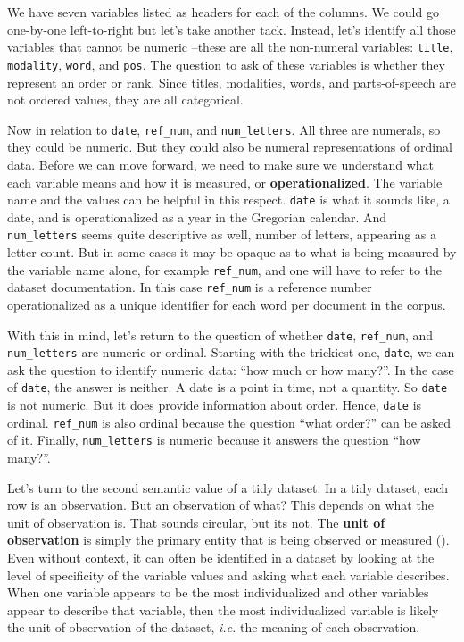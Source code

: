 \documentclass[
  letterpaper,
]{latex/krantz}
\theoremstyle{definition}
\theoremstyle{remark}
\begin{document}
We have seven variables listed as headers for each of the columns. We
could go one-by-one left-to-right but let's take another tack. Instead,
let's identify all those variables that cannot be numeric --these are
all the non-numeral variables: \texttt{title}, \texttt{modality},
\texttt{word}, and \texttt{pos}. The question to ask of these variables
is whether they represent an order or rank. Since titles, modalities,
words, and parts-of-speech are not ordered values, they are all
categorical.

Now in relation to \texttt{date}, \texttt{ref\_num}, and
\texttt{num\_letters}. All three are numerals, so they could be numeric.
But they could also be numeral representations of ordinal data. Before
we can move forward, we need to make sure we understand what each
variable means and how it is measured, or \textbf{operationalized}. The
variable name and the values can be helpful in this respect.
\texttt{date} is what it sounds like, a date, and is operationalized as
a year in the Gregorian calendar. And \texttt{num\_letters} seems quite
descriptive as well, number of letters, appearing as a letter count. But
in some cases it may be opaque as to what is being measured by the
variable name alone, for example \texttt{ref\_num}, and one will have to
refer to the dataset documentation. In this case \texttt{ref\_num} is a
reference number operationalized as a unique identifier for each word
per document in the corpus.

With this in mind, let's return to the question of whether
\texttt{date}, \texttt{ref\_num}, and \texttt{num\_letters} are numeric
or ordinal. Starting with the trickiest one, \texttt{date}, we can ask
the question to identify numeric data: ``how much or how many?''. In the
case of \texttt{date}, the answer is neither. A date is a point in time,
not a quantity. So \texttt{date} is not numeric. But it does provide
information about order. Hence, \texttt{date} is ordinal.
\texttt{ref\_num} is also ordinal because the question ``what order?''
can be asked of it. Finally, \texttt{num\_letters} is numeric because it
answers the question ``how many?''.

Let's turn to the second semantic value of a tidy dataset. In a tidy
dataset, each row is an observation. But an observation of what? This
depends on what the unit of observation is. That sounds circular, but
its not. The \textbf{unit of observation} is simply the primary entity
that is being observed or measured (). Even without context, it can often be identified in a dataset by
looking at the level of specificity of the variable values and asking
what each variable describes. When one variable appears to be the most
individualized and other variables appear to describe that variable,
then the most individualized variable is likely the unit of observation
of the dataset, \emph{i.e.} the meaning of each observation.
\end{document}
